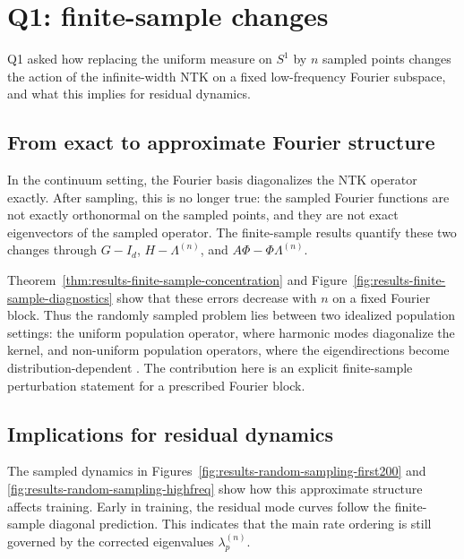 \section{Q1: finite-sample changes}
\label{sec:discussion-q1}

Q1 asked how replacing the uniform measure on \(S^1\) by \(n\) sampled points
changes the action of the infinite-width NTK on a fixed low-frequency Fourier
subspace, and what this implies for residual dynamics.

\subsection{From exact to approximate Fourier structure}
\label{subsec:discussion-q1-structure}

In the continuum setting, the Fourier basis diagonalizes the NTK operator
exactly. After sampling, this is no longer true: the sampled Fourier functions
are not exactly orthonormal on the sampled points, and they are not exact
eigenvectors of the sampled operator. The finite-sample results quantify these
two changes through \(G-I_d\), \(H-\Lambda^{(n)}\), and
\(A\Phi-\Phi\Lambda^{(n)}\).

Theorem~\ref{thm:results-finite-sample-concentration} and
Figure~\ref{fig:results-finite-sample-diagnostics} show that these errors
decrease with \(n\) on a fixed Fourier block. Thus the randomly sampled problem
lies between two idealized population settings: the uniform population operator,
where harmonic modes diagonalize the kernel, and non-uniform population
operators, where the eigendirections become distribution-dependent
\citep{basri2020frequencybiasneuralnetworks,bietti2019inductivebiasneuraltangent,cao2020understandingspectralbiasdeep}.
The contribution here is an explicit finite-sample perturbation statement for a
prescribed Fourier block.

\subsection{Implications for residual dynamics}
\label{subsec:discussion-q1-dynamics}

The sampled dynamics in
Figures~\ref{fig:results-random-sampling-first200} and
\ref{fig:results-random-sampling-highfreq} show how this approximate structure
affects training. Early in training, the residual mode curves follow the
finite-sample diagonal prediction. This indicates that the main rate ordering is
still governed by the corrected eigenvalues \(\lambda_p^{(n)}\).

